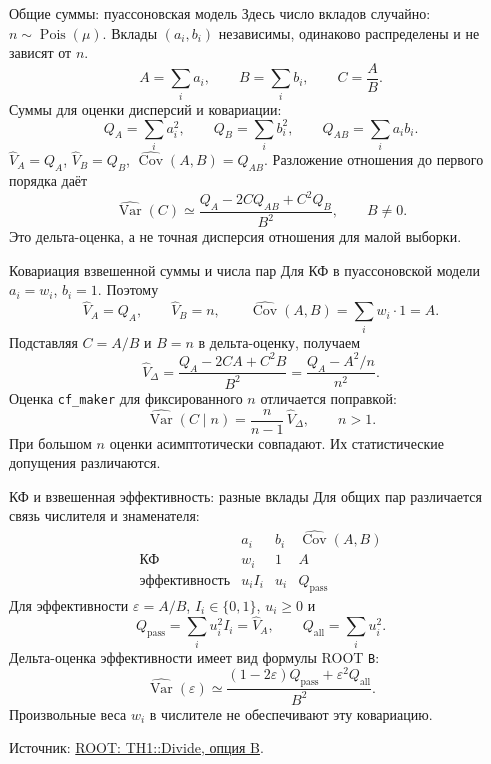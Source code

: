 \begin{frame}{Общие суммы: пуассоновская модель}
    \small
    Здесь число вкладов случайно: $n\sim\operatorname{Pois}(\mu)$.
    Вклады $(a_i,b_i)$ независимы, одинаково распределены и не зависят от $n$.
    \[
        A=\sum_i a_i, \qquad B=\sum_i b_i, \qquad C=\frac{A}{B}.
    \]
    Суммы для оценки дисперсий и ковариации:
    \[
        Q_A=\sum_i a_i^2, \qquad
        Q_B=\sum_i b_i^2, \qquad Q_{AB}=\sum_i a_i b_i.
    \]
    $\widehat V_A=Q_A$, $\widehat V_B=Q_B$,
    $\widehat{\operatorname{Cov}}(A,B)=Q_{AB}$.
    Разложение отношения до первого порядка даёт
    \[
        \widehat{\operatorname{Var}}(C)\simeq
        \frac{Q_A-2C Q_{AB}+C^2 Q_B}{B^2},
        \qquad B\ne 0.
    \]
    Это дельта-оценка, а не точная дисперсия отношения для малой выборки.
\end{frame}

\begin{frame}{Ковариация взвешенной суммы и числа пар}
    \small
    Для КФ в пуассоновской модели $a_i=w_i$, $b_i=1$. Поэтому
    \[
        \widehat V_A=Q_A, \qquad \widehat V_B=n, \qquad
        \widehat{\operatorname{Cov}}(A,B)=\sum_i w_i\cdot 1=A.
    \]
    Подставляя $C=A/B$ и $B=n$ в дельта-оценку, получаем
    \[
        \widehat V_{\Delta}=
        \frac{Q_A-2CA+C^2B}{B^2}
        =\frac{Q_A-A^2/n}{n^2}.
    \]
    Оценка \texttt{cf\_maker} для фиксированного $n$ отличается поправкой:
    \[
        \widehat{\operatorname{Var}}(C\mid n)
        =\frac{n}{n-1}\,\widehat V_{\Delta}, \qquad n>1.
    \]
    При большом $n$ оценки асимптотически совпадают.
    Их статистические допущения различаются.
\end{frame}

\begin{frame}{КФ и взвешенная эффективность: разные вклады}
    \small
    Для общих пар различается связь числителя и знаменателя:
    \[
        \begin{array}{l|c|c|c}
            & a_i & b_i & \widehat{\operatorname{Cov}}(A,B)\\ \hline
            \text{КФ} & w_i & 1 & A\\
            \text{эффективность} & u_i I_i & u_i & Q_{\mathrm{pass}}
        \end{array}
    \]
    Для эффективности $\varepsilon=A/B$, $I_i\in\{0,1\}$, $u_i\geq 0$ и
    \[
        Q_{\mathrm{pass}}=\sum_i u_i^2 I_i=\widehat V_A,
        \qquad Q_{\mathrm{all}}=\sum_i u_i^2.
    \]
    Дельта-оценка эффективности имеет вид формулы ROOT \texttt{B}:
    \[
        \widehat{\operatorname{Var}}(\varepsilon)\simeq
        \frac{(1-2\varepsilon)Q_{\mathrm{pass}}+\varepsilon^2 Q_{\mathrm{all}}}{B^2}.
    \]
    Произвольные веса $w_i$ в числителе не обеспечивают эту ковариацию.
    \par\medskip
    {\footnotesize Источник:
        \href{https://root.cern.ch/doc/master/TH1_8cxx_source.html}{ROOT: TH1::Divide, опция B}.}
\end{frame}

